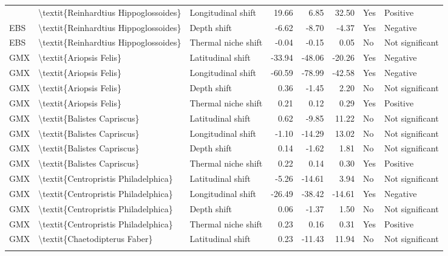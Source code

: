 \begin{longtable}[t]{lllrrrll}
{{\addlinespace
EBS & \textbackslash{}textit\{Reinhardtius Hippoglossoides\} & Longitudinal shift & 19.66 & 6.85 & 32.50 & Yes & Positive\\
EBS & \textbackslash{}textit\{Reinhardtius Hippoglossoides\} & Depth shift & -6.62 & -8.70 & -4.37 & Yes & Negative\\
EBS & \textbackslash{}textit\{Reinhardtius Hippoglossoides\} & Thermal niche shift & -0.04 & -0.15 & 0.05 & No & Not significant\\
GMX & \textbackslash{}textit\{Ariopsis Felis\} & Latitudinal shift & -33.94 & -48.06 & -20.26 & Yes & Negative\\
GMX & \textbackslash{}textit\{Ariopsis Felis\} & Longitudinal shift & -60.59 & -78.99 & -42.58 & Yes & Negative\\
\addlinespace
GMX & \textbackslash{}textit\{Ariopsis Felis\} & Depth shift & 0.36 & -1.45 & 2.20 & No & Not significant\\
GMX & \textbackslash{}textit\{Ariopsis Felis\} & Thermal niche shift & 0.21 & 0.12 & 0.29 & Yes & Positive\\
GMX & \textbackslash{}textit\{Balistes Capriscus\} & Latitudinal shift & 0.62 & -9.85 & 11.22 & No & Not significant\\
GMX & \textbackslash{}textit\{Balistes Capriscus\} & Longitudinal shift & -1.10 & -14.29 & 13.02 & No & Not significant\\
GMX & \textbackslash{}textit\{Balistes Capriscus\} & Depth shift & 0.14 & -1.62 & 1.81 & No & Not significant\\
\addlinespace
GMX & \textbackslash{}textit\{Balistes Capriscus\} & Thermal niche shift & 0.22 & 0.14 & 0.30 & Yes & Positive\\
GMX & \textbackslash{}textit\{Centropristis Philadelphica\} & Latitudinal shift & -5.26 & -14.61 & 3.94 & No & Not significant\\
GMX & \textbackslash{}textit\{Centropristis Philadelphica\} & Longitudinal shift & -26.49 & -38.42 & -14.61 & Yes & Negative\\
GMX & \textbackslash{}textit\{Centropristis Philadelphica\} & Depth shift & 0.06 & -1.37 & 1.50 & No & Not significant\\
GMX & \textbackslash{}textit\{Centropristis Philadelphica\} & Thermal niche shift & 0.23 & 0.16 & 0.31 & Yes & Positive\\
\addlinespace
GMX & \textbackslash{}textit\{Chaetodipterus Faber\} & Latitudinal shift & 0.23 & -11.43 & 11.94 & No & Not significant\\
}}
\end{longtable}
